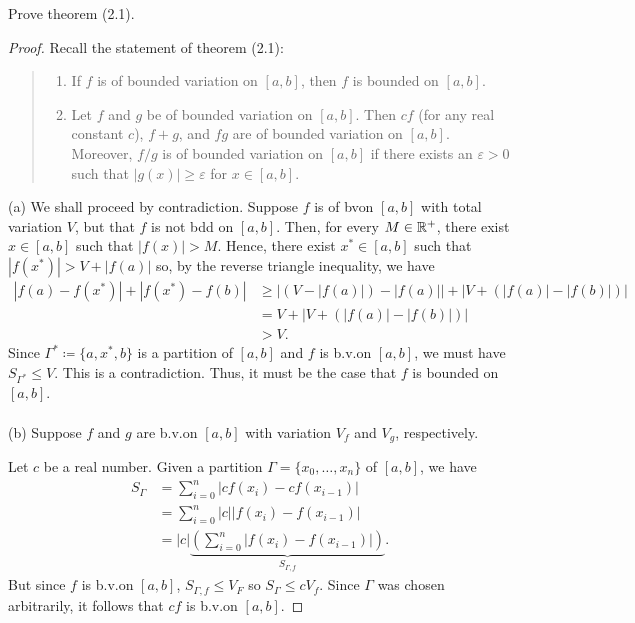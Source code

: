 \begin{problem}
Prove theorem (2.1).
\end{problem}
\begin{proof}
  Recall the statement of theorem (2.1):
  \begin{quote}
    \begin{enumerate}[label=(\alph*),noitemsep]
    \item If $f$ is of bounded variation on $[a,b]$, then $f$ is bounded on
      $[a,b]$.
    \item Let $f$ and $g$ be of bounded variation on $[a,b]$. Then $cf$
      (for any real constant $c$), $f+g$, and $fg$ are of bounded variation
      on $[a,b]$. Moreover, $f/g$ is of bounded variation on $[a,b]$ if
      there exists an $\varepsilon>0$ such that $|g(x)|\geq\varepsilon$ for
      $x\in[a,b]$.
    \end{enumerate}
  \end{quote}
  \noindent%
  (a) We shall proceed by contradiction. Suppose $f$ is of \gls{bv}\@ on
  $[a,b]$ with total variation $V$, but that $f$ is not \gls{bdd} on
  $[a,b]$. Then, for every $M\in\mathbb{R}^+$, there exist $x\in[a,b]$ such that
  $|f(x)|>M$. Hence, there exist $x^*\in[a,b]$ such that
  $|f(x^*)|>V+|f(a)|$ so, by the reverse triangle inequality, we have
  \begin{equation}
    \label{eq:1:3}
    \begin{aligned}
      |f(a)-f(x^*)|+|f(x^*)-f(b)| &\geq
      |(V-|f(a)|)-|f(a)||+|V+(|f(a)|-|f(b)|)|\\
      &=V+|V+(|f(a)|-|f(b)|)|\\
      &>V.
    \end{aligned}
  \end{equation}
  Since $\Gamma^*\coloneqq\{a,x^*,b\}$ is a partition of $[a,b]$ and $f$ is
  b.v.\@ on $[a,b]$, we must have $S_{\Gamma^*}\leq V$. This is a
  contradiction. Thus, it must be the case that $f$ is bounded on
  $[a,b]$. %
  \\\\
  (b) Suppose $f$ and $g$ are b.v.\@ on $[a,b]$ with variation $V_f$ and
  $V_g$, respectively.

  Let $c$ be a real number. Given a partition $\Gamma=\{x_0,\dotsc,x_n\}$
  of $[a,b]$, we have
  \begin{equation}
    \label{eq:eq:1:4}
    \begin{aligned}
      S_\Gamma&=\sum_{i=0}^n|cf(x_i)-cf(x_{i-1})|\\
      &=\sum_{i=0}^n|c||f(x_i)-f(x_{i-1})|\\
      &=|c|\underbrace{\left(\sum_{i=0}^n|f(x_i)-f(x_{i-1})|\right)}_{S_{\Gamma,f}}.
    \end{aligned}
  \end{equation}
  But since $f$ is b.v.\@ on $[a,b]$, $S_{\Gamma,f}\leq V_F$ so
  $S_\Gamma\leq cV_f$. Since $\Gamma$ was chosen arbitrarily, it follows
  that $cf$ is b.v.\@ on $[a,b]$.
\end{proof}

